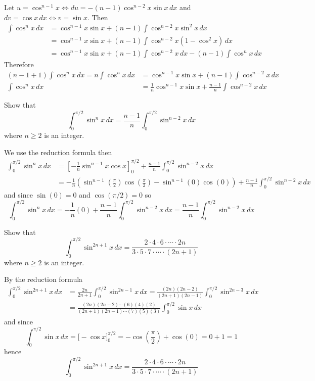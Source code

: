 \begin{solution}
    Let \(u=\cos^{n-1}x\iff du=-(n-1)\cos^{n-2}x\sin x\,dx\) and
    \(dv=\cos x\,dx\iff v=\sin x\).
    Then
    \begin{align*}
        \int\cos^n x\,dx
        &= \cos^{n-1} x\sin x+(n-1)\int\cos^{n-2}x\sin^2 x\,dx \\
        &= \cos^{n-1} x\sin x+(n-1)\int \cos^{n-2}x(1-\cos^2 x)\,dx \\
        &= \cos^{n-1} x\sin x+(n-1)\int \cos^{n-2}x\,dx-(n-1)\int\cos^n x\,dx
    \end{align*}
    Therefore
    \begin{align*}
        (n-1+1)\int\cos^n x\,dx=n\int\cos^n x\,dx
        &= \cos^{n-1}x\sin x+(n-1)\int \cos^{n-2}x\,dx \\
        \int\cos^n x\,dx
        &= \frac{1}{n}\cos^{n-1}x\sin x
        +\frac{n-1}{n}\int\cos^{n-2}x\,dx 
    \end{align*}
\end{solution}
\begin{problem}
    Show that
    \[\int_0^{\pi/2}\sin^n x\,dx=\frac{n-1}{n}\int_0^{\pi/2}\sin^{n-2}x\,dx\]
    where \(n\geq 2\) is an integer.
\end{problem}
\begin{solution}
    We use the reduction formula then
    \begin{align*}
        \int_0^{\pi/2}\sin^n x\,dx
        &= \left[-\frac{1}{n}\sin^{n-1} x\cos x\right]_0^{\pi/2}
        +\frac{n-1}{n}\int_0^{\pi/2}\sin^{n-2} x\,dx \\
        &= -\frac{1}{n}\left(\sin^{n-1}\left(\frac{\pi}{2}\right)
        \cos\left(\frac{\pi}{2}\right)-\sin^{n-1}(0)\cos(0)\right)
        +\frac{n-1}{n}\int_0^{\pi/2}\sin^{n-2} x\,dx
    \end{align*}
    and since \(\sin(0)=0\) and \(\cos(\pi/2)=0\) so
    \[\int_0^{\pi/2}\sin^n x\,dx=-\frac{1}{n}(0)
    +\frac{n-1}{n}\int_0^{\pi/2}\sin^{n-2} x\,dx
    =\frac{n-1}{n}\int_0^{\pi/2}\sin^{n-2} x\,dx\]
\end{solution}
\begin{problem}
    Show that
    \[\int_0^{\pi/2}\sin^{2n+1} x\,dx
    =\frac{2\cdot4\cdot6\cdot\cdots\cdot2n}
    {3\cdot5\cdot7\cdot\cdots\cdot(2n+1)}\]
    where \(n\geq 2\) is an integer.
\end{problem}
\begin{solution}
    By the reduction formula
    \begin{align*}
        \int_0^{\pi/2}\sin^{2n+1} x\,dx
        &= \frac{2n}{2n+1}\int_{0}^{\pi/2}\sin^{2n-1} x\,dx
        =\frac{(2n)(2n-2)}{(2n+1)(2n-1)}\int_{0}^{\pi/2}\sin^{2n-3} x\,dx \\
        &= \frac{(2n)(2n-2)\cdots(6)(4)(2)}{(2n+1)(2n-1)\cdots(7)(5)(3)}
        \int_{0}^{\pi/2}\sin x\,dx
    \end{align*}
    and since
    \[\int_{0}^{\pi/2}\sin x\,dx=\Big[-\cos x\Big]_0^{\pi/2}
    =-\cos\left(\frac{\pi}{2}\right)+\cos(0)=0+1=1\]
    hence
    \[\int_0^{\pi/2}\sin^{2n+1} x\,dx
    =\frac{2\cdot4\cdot6\cdot\cdots\cdot2n}
    {3\cdot5\cdot7\cdot\cdots\cdot(2n+1)}\]
\end{solution}
